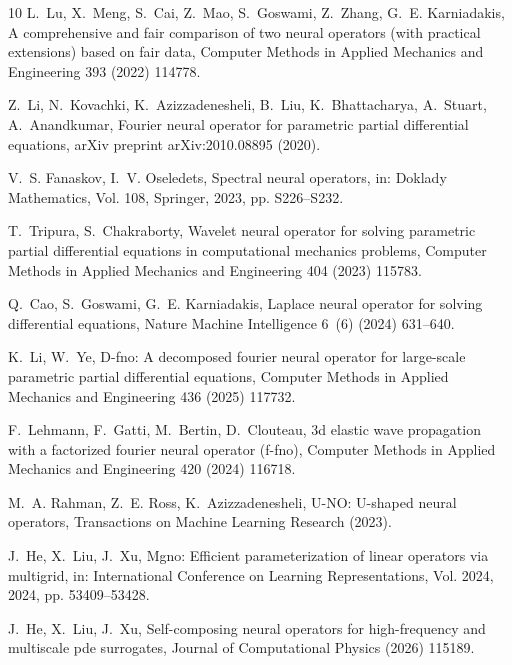 \documentclass[preprint,numbers,sort&compress]{elsarticle}
\begin{document}
\begin{thebibliography}{10}
				L.~Lu, X.~Meng, S.~Cai, Z.~Mao, S.~Goswami, Z.~Zhang, G.~E. Karniadakis, A
				comprehensive and fair comparison of two neural operators (with practical
				extensions) based on fair data, Computer Methods in Applied Mechanics and
				Engineering 393 (2022) 114778.
				
				Z.~Li, N.~Kovachki, K.~Azizzadenesheli, B.~Liu, K.~Bhattacharya, A.~Stuart,
				A.~Anandkumar, Fourier neural operator for parametric partial differential
				equations, arXiv preprint arXiv:2010.08895 (2020).
				
				V.~S. Fanaskov, I.~V. Oseledets, Spectral neural operators, in: Doklady
				Mathematics, Vol. 108, Springer, 2023, pp. S226--S232.
				
				T.~Tripura, S.~Chakraborty, Wavelet neural operator for solving parametric
				partial differential equations in computational mechanics problems, Computer
				Methods in Applied Mechanics and Engineering 404 (2023) 115783.
				
				Q.~Cao, S.~Goswami, G.~E. Karniadakis, Laplace neural operator for solving
				differential equations, Nature Machine Intelligence 6~(6) (2024) 631--640.
				
				K.~Li, W.~Ye, D-fno: A decomposed fourier neural operator for large-scale
				parametric partial differential equations, Computer Methods in Applied
				Mechanics and Engineering 436 (2025) 117732.
				
				F.~Lehmann, F.~Gatti, M.~Bertin, D.~Clouteau, 3d elastic wave propagation with
				a factorized fourier neural operator (f-fno), Computer Methods in Applied
				Mechanics and Engineering 420 (2024) 116718.
				
				M.~A. Rahman, Z.~E. Ross, K.~Azizzadenesheli, U-{NO}: U-shaped neural
				operators, Transactions on Machine Learning Research (2023).
				
				J.~He, X.~Liu, J.~Xu, Mgno: Efficient parameterization of linear operators via
				multigrid, in: International Conference on Learning Representations, Vol.
				2024, 2024, pp. 53409--53428.
				
				J.~He, X.~Liu, J.~Xu, Self-composing neural operators for high-frequency and
				multiscale pde surrogates, Journal of Computational Physics (2026) 115189.
				

\end{thebibliography}
\end{document}
